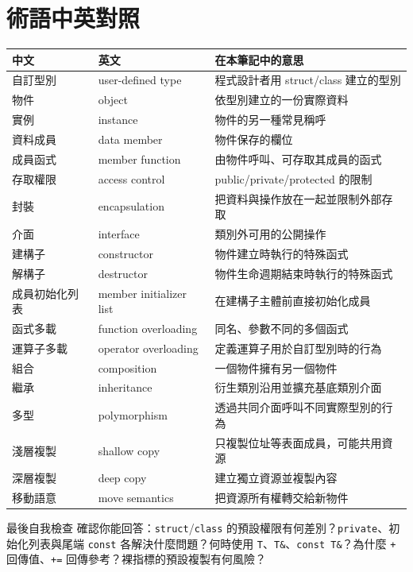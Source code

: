 \documentclass[11pt,a4paper]{article}
\newcommand{\code}[1]{\texttt{#1}}
\begin{document}
\section{術語中英對照}

\begin{longtable}{p{43mm}p{48mm}p{48mm}}
\toprule
中文 & 英文 & 在本筆記中的意思 \\
\midrule
\endhead
自訂型別 & user-defined type & 程式設計者用 struct/class 建立的型別 \\
物件 & object & 依型別建立的一份實際資料 \\
實例 & instance & 物件的另一種常見稱呼 \\
資料成員 & data member & 物件保存的欄位 \\
成員函式 & member function & 由物件呼叫、可存取其成員的函式 \\
存取權限 & access control & public/private/protected 的限制 \\
封裝 & encapsulation & 把資料與操作放在一起並限制外部存取 \\
介面 & interface & 類別外可用的公開操作 \\
建構子 & constructor & 物件建立時執行的特殊函式 \\
解構子 & destructor & 物件生命週期結束時執行的特殊函式 \\
成員初始化列表 & member initializer list & 在建構子主體前直接初始化成員 \\
函式多載 & function overloading & 同名、參數不同的多個函式 \\
運算子多載 & operator overloading & 定義運算子用於自訂型別時的行為 \\
組合 & composition & 一個物件擁有另一個物件 \\
繼承 & inheritance & 衍生類別沿用並擴充基底類別介面 \\
多型 & polymorphism & 透過共同介面呼叫不同實際型別的行為 \\
淺層複製 & shallow copy & 只複製位址等表面成員，可能共用資源 \\
深層複製 & deep copy & 建立獨立資源並複製內容 \\
移動語意 & move semantics & 把資源所有權轉交給新物件 \\
\bottomrule
\end{longtable}

\begin{keybox}{最後自我檢查}
確認你能回答：\code{struct}/\code{class} 的預設權限有何差別？\code{private}、初始化列表與尾端 \code{const} 各解決什麼問題？何時使用 \code{T}、\code{T\&}、\code{const T\&}？為什麼 \code{+} 回傳值、\code{+=} 回傳參考？裸指標的預設複製有何風險？
\end{keybox}
\end{document}
